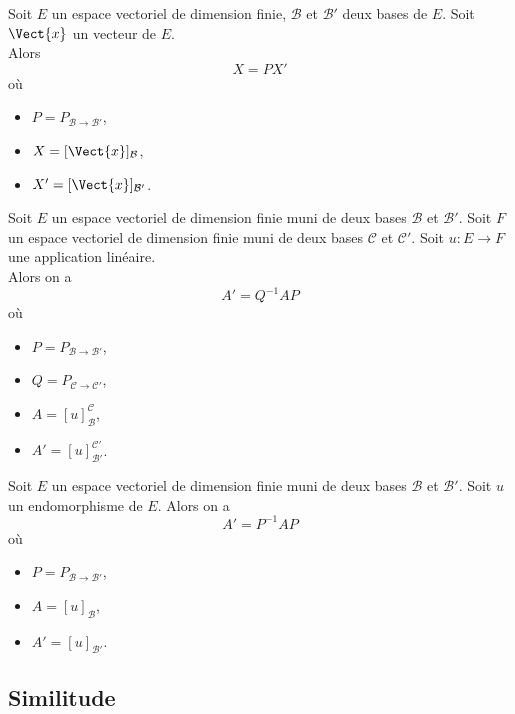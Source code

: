\documentclass{book}
\begin{document}
\begin{Proposition}
Soit $E$ un espace vectoriel de dimension finie, $\mathcal{B}$ et $\mathcal{B}'$ deux bases de $E$.
Soit $\Vect{x}$ un vecteur de $E$.\\
Alors \[ X = PX'\]
où
\begin{itemize}
\item $P = P_{\mathcal{B} \to \mathcal{B}'}$,
\item $X = [\Vect{x}]_{\mathcal{B}}$,
\item $X' = [\Vect{x}]_{\mathcal{B}'}$.
\end{itemize}
\end{Proposition}
\begin{Proposition}
Soit $E$ un espace vectoriel de dimension finie muni de deux bases $\mathcal{B}$ et $\mathcal{B}'$.
Soit $F$ un espace vectoriel de dimension finie muni de deux bases $\mathcal{C}$ et $\mathcal{C}'$.
Soit $u:E\to F$ une application linéaire.\\
Alors on a \[ A' = Q^{-1} A P \]
où
\begin{itemize}
\item $P = P_{\mathcal{B} \to \mathcal{B}'}$,
\item $Q = P_{\mathcal{C} \to \mathcal{C}'}$,
\item $A = [u]_{\mathcal{B}}^{\mathcal{C}}$,
\item $A' = [u]_{\mathcal{B}'}^{\mathcal{C}'}$.
\end{itemize}
\end{Proposition}
\begin{Corollaire}

Soit $E$ un espace vectoriel de dimension finie muni de deux bases $\mathcal{B}$ et $\mathcal{B}'$.
Soit $u$ un endomorphisme de $E$.
Alors on a \[ A' = P^{-1} A P \]
où
\begin{itemize}
\item $P =  P_{\mathcal{B} \to \mathcal{B}'}$,
\item $A =  [u]_{\mathcal{B}}$,
\item $A' =  [u]_{\mathcal{B}'}$.
\end{itemize}
\end{Corollaire}

\subsection{Similitude}
\end{document}
